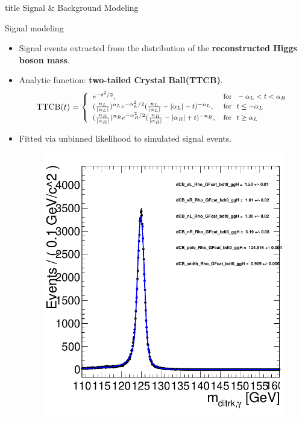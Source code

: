 \documentclass[9pt,aspectratio=1610]{beamer}
\newcommand{\khl}[1]{\textbf{\color{structure}#1}}
\begin{document}
\begin{frame}
	\vfill
	\centering
	\begin{beamercolorbox}[sep=8pt,center,shadow=false,rounded=true]{title}
		\Huge Signal \& Background Modeling \par%
	\end{beamercolorbox}
	\vfill
\end{frame}

\begin{frame}{Signal modeling}
	\begin{itemize}
		\item Signal events extracted from the distribution of the \khl{reconstructed Higgs boson mass}.
		\item Analytic function: \textbf{two-tailed Crystal Ball(TTCB)}.
		\begin{align*}
			\footnotesize
			\label{eq:ttcb}
			\mathrm{TTCB}(t) = \left\{
			\begin{array}{l l}
				e^{-t^2/2}, & \mathrm{for}~~-\alpha_L<t<\alpha_R\\
				(\frac{n_L}{|\alpha_L|})^{n_{L}}e^{-\alpha_L^2/2}(\frac{n_L}{|\alpha_L|}-|\alpha_L|-t)^{-n_{L}}, & \mathrm{for}~~t\leq-\alpha_L\\
				(\frac{n_R}{|\alpha_R|})^{n_{R}}e^{-\alpha_R^2/2}(\frac{n_R}{|\alpha_R|}-|\alpha_R|+t)^{-n_{R}}, & \mathrm{for}~~t\geq\alpha_L\\
			\end{array} \right.
		\end{align*}
		\item Fitted via unbinned likelihood to simulated signal events.
		\vspace{0.5em}
		\begin{figure}
			\centering
			\includegraphics[height=0.52\textheight]{figures/misc/signal_ggH_Rho_cat0.pdf}

\end{figure}
\end{itemize}
\end{frame}
\end{document}
